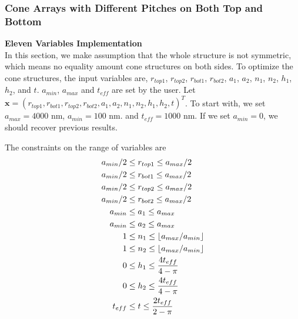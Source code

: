 \documentclass[12pt]{article}
\numberwithin{equation}{section}
\DeclarePairedDelimiter\floor{\lfloor}{\rfloor}
\numberwithin{equation}{section}
\begin{document}
\subsubsection{Cone Arrays with Different Pitches  on Both Top and Bottom}
\begin{outline}[enumerate]
\1 \textbf{Eleven Variables Implementation} \\
In this section, we make assumption that the whole structure is not symmetric, which means no equality amount cone structures on both sides.  To optimize the cone structures, the input variables are, $r_{top1}$, $r_{top2}$, $r_{bot1}$, $r_{bot2}$, $a_1$, $a_2$, $n_1$, $n_2$, $h_1$, $h_2$, and $t$. $a_{min}$, $a_{max}$ and $t_{eff}$ are set by the user. Let $\mathbf{x} = \left ( r_{top1}, r_{bot1}, r_{top2}, r_{bot2}, a_1, a_2, n_1, n_2, h_1, h_2, t  \right )^T $. To start with, we set $a_{max} = 4000$ nm, $a_{min} = 100$ nm.  and $t_{eff} = 1000$ nm. If we set $a_{min} = 0$, we should recover previous results.

The constraints on the range of variables are
\begin{align*}
a_{min}/2 & \leq r_{top1} \leq a_{max}/2 \\
a_{min}/2 & \leq r_{bot1} \leq a_{max}/2 \\
a_{min}/2 & \leq r_{top2} \leq a_{max}/2 \\
a_{min}/2 & \leq r_{bot2} \leq a_{max}/2 \\
a_{min} & \leq a_{1} \leq a_{max} \\
a_{min} & \leq a_{2} \leq a_{max} \\
1 & \leq n_1 \leq \floor{a_{max}/a_{min}} \\
1 & \leq n_2 \leq \floor{a_{max}/a_{min}} \\
0 & \leq h_1 \leq  \frac {4t_{eff}}{4- \pi}\\ 
0 & \leq h_2 \leq  \frac {4t_{eff}}{4- \pi}\\
t_{eff} & \leq t \leq \frac {2t_{eff}}{2- \pi}
\end{align*}


\end{outline}
\end{document}
